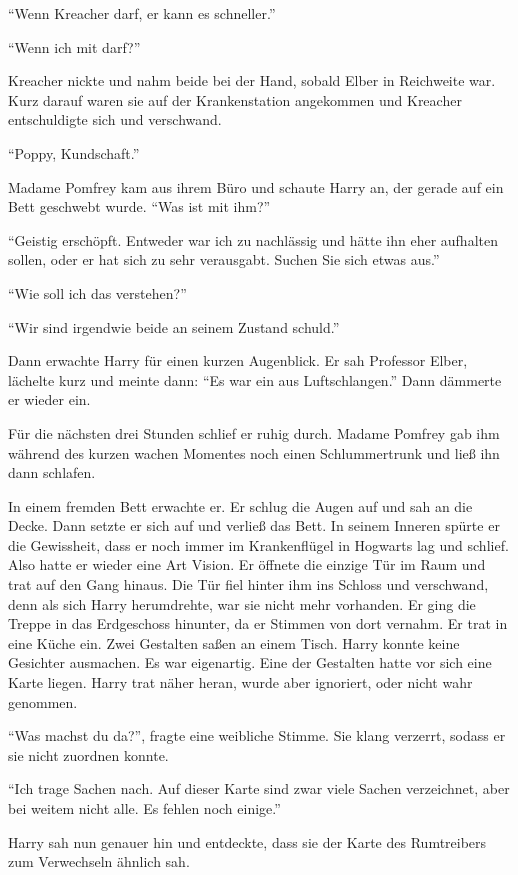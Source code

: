 \enquote{Wenn Kreacher darf, er kann es schneller.}

\enquote{Wenn ich mit darf?}

Kreacher nickte und nahm beide bei der Hand, sobald Elber in Reichweite war. Kurz darauf waren sie auf der Krankenstation angekommen und Kreacher entschuldigte sich und verschwand.

\enquote{Poppy, Kundschaft.}

Madame Pomfrey kam aus ihrem Büro und schaute Harry an, der gerade auf ein Bett geschwebt wurde. \enquote{Was ist mit ihm?}

\enquote{Geistig erschöpft. Entweder war ich zu nachlässig und hätte ihn eher aufhalten sollen, oder er hat sich zu sehr verausgabt. Suchen Sie sich etwas aus.}

\enquote{Wie soll ich das verstehen?}

\enquote{Wir sind irgendwie beide an seinem Zustand schuld.}

Dann erwachte Harry für einen kurzen Augenblick. Er sah Professor Elber, lächelte kurz und meinte dann: \enquote{Es war ein  aus Luftschlangen.} Dann dämmerte er wieder ein.

Für die nächsten drei Stunden schlief er ruhig durch. Madame Pomfrey gab ihm während des kurzen wachen Momentes noch einen Schlummertrunk und ließ ihn dann schlafen.

In einem fremden Bett erwachte er. Er schlug die Augen auf und sah an die Decke. Dann setzte er sich auf und verließ das Bett. In seinem Inneren spürte er die Gewissheit, dass er noch immer im Krankenflügel in Hogwarts lag und schlief. Also hatte er wieder eine Art Vision. Er öffnete die einzige Tür im Raum und trat auf den Gang hinaus. Die Tür fiel hinter ihm ins Schloss und verschwand, denn als sich Harry herumdrehte, war sie nicht mehr vorhanden. Er ging die Treppe in das Erdgeschoss hinunter, da er Stimmen von dort vernahm. Er trat in eine Küche ein. Zwei Gestalten saßen an einem Tisch. Harry konnte keine Gesichter ausmachen. Es war eigenartig. Eine der Gestalten hatte vor sich eine Karte liegen. Harry trat näher heran, wurde aber ignoriert, oder nicht wahr genommen.

\enquote{Was machst du da?}, fragte eine weibliche Stimme. Sie klang verzerrt, sodass er sie nicht zuordnen konnte.

\enquote{Ich trage Sachen nach. Auf dieser Karte sind zwar viele Sachen verzeichnet, aber bei weitem nicht alle. Es fehlen noch einige.}

Harry sah nun genauer hin und entdeckte, dass sie der Karte des Rumtreibers zum Verwechseln ähnlich sah.

